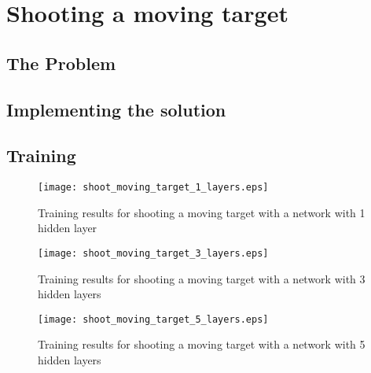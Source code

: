 


\section{Shooting a moving target}

\subsection{The Problem}



\subsection{Implementing the solution}




\subsection{Training}




\begin{figure}
    \begin{center}
        \texttt{[image: shoot\_moving\_target\_1\_layers.eps]}
        \caption{Training results for shooting a moving target with a network with 1 hidden layer}
        \label{train_results_shoot_1_layers}
    \end{center}
\end{figure}

\begin{figure}
    \begin{center}
        \texttt{[image: shoot\_moving\_target\_3\_layers.eps]}
        \caption{Training results for shooting a moving target with a network with 3 hidden layers}
        \label{train_results_shoot_3_layers}
    \end{center}
\end{figure}

\begin{figure}
    \begin{center}
        \texttt{[image: shoot\_moving\_target\_5\_layers.eps]}
        \caption{Training results for shooting a moving target with a network with 5 hidden layers}
        \label{train_results_shoot_5_layers}
    \end{center}
\end{figure}

